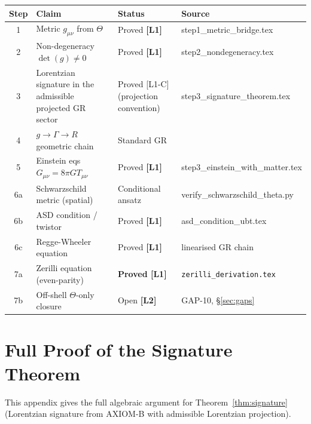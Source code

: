 \documentclass[12pt,a4paper]{article}
\theoremstyle{definition}
\theoremstyle{remark}
\newcommand{\Lone}{\textbf{[L1]}}
\newcommand{\Ltwo}{\textbf{[L2]}}
\begin{document}
\begin{tcolorbox}[colback=blue!3!white,colframe=blue!55!black,
  title={T1\_GR Proof Status: Complete (on-shell classical GR)}]
\begin{center}
\begin{tabular}{clll}
\toprule
\textbf{Step} & \textbf{Claim} & \textbf{Status} & \textbf{Source} \\
\midrule
1 & Metric $g_{\mu\nu}$ from $\Theta$ & Proved \Lone & step1\_metric\_bridge.tex \\
2 & Non-degeneracy $\det(g)\neq 0$ & Proved \Lone & step2\_nondegeneracy.tex \\
3 & Lorentzian signature in the admissible projected GR sector & Proved [L1-C] (projection convention) & step3\_signature\_theorem.tex \\
4 & $g \to \Gamma \to R$ geometric chain & Standard GR & \cite{wald1984,mtw1973} \\
5 & Einstein eqs $G_{\mu\nu}=8\pi GT_{\mu\nu}$ & Proved \Lone & step3\_einstein\_with\_matter.tex \\
6a & Schwarzschild metric (spatial) & Conditional ansatz & verify\_schwarzschild\_theta.py \\
6b & ASD condition / twistor & Proved \Lone & asd\_condition\_ubt.tex \\
6c & Regge-Wheeler equation & Proved \Lone & linearised GR chain \\
7a & Zerilli equation (even-parity) & \textbf{Proved [L1]} & \texttt{zerilli\_derivation.tex} \\
7b & Off-shell $\Theta$-only closure & Open \Ltwo & GAP-10, \S\ref{sec:gaps} \\
\bottomrule
\end{tabular}
\end{center}
\end{tcolorbox}

\appendix

\section{Full Proof of the Signature Theorem}
\label{app:signature}

This appendix gives the full algebraic argument for
Theorem~\ref{thm:signature} (Lorentzian signature from AXIOM-B with admissible Lorentzian projection).
\end{document}
